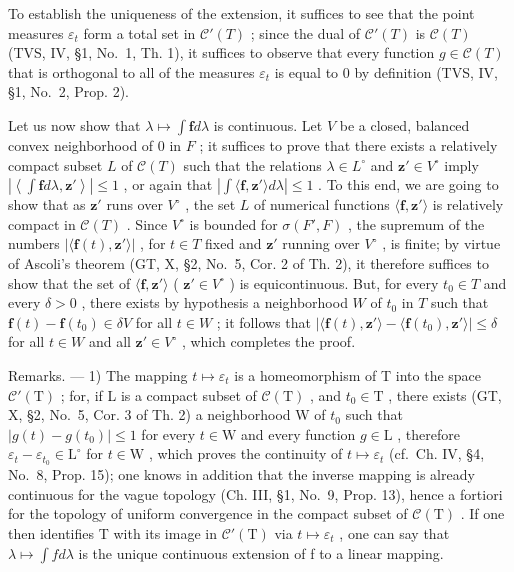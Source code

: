 To establish the uniqueness of the extension, it suffices to see that the point measures \(\varepsilon_{t}\) form a total set in \(\mathcal{C}'(T)\) ; since the dual of \(\mathcal{C}'(T)\) is \(\mathcal{C}(T)\) (TVS, IV, §1, No.~1, Th. 1), it suffices to observe that every function \(g \in \mathcal{C}(T)\) that is orthogonal to all of the measures \(\varepsilon_{t}\) is equal to 0 by definition (TVS, IV, §1, No.~2, Prop. 2).

Let us now show that \(\lambda \mapsto \int \mathbf{f}d\lambda\) is continuous. Let \(V\) be a closed, balanced convex neighborhood of 0 in \(F\) ; it suffices to prove that there exists a relatively compact subset \(L\) of \(\mathcal{C}(T)\) such that the relations \(\lambda \in L^{\circ}\) and \(\mathbf{z}' \in V^{\circ}\) imply \(\left|\left\langle \int \mathbf{f}d\lambda, \mathbf{z}' \right\rangle \right| \leqslant 1\) , or again that \(\left|\int \langle \mathbf{f}, \mathbf{z}' \rangle d\lambda \right| \leqslant 1\) . To this end, we are going to show that as \(\mathbf{z}'\) runs over \(V^{\circ}\) , the set \(L\) of numerical functions \(\langle \mathbf{f}, \mathbf{z}' \rangle\) is relatively compact in \(\mathcal{C}(T)\) . Since \(V^{\circ}\) is bounded for \(\sigma(F', F)\) , the supremum of the numbers \(|\langle \mathbf{f}(t), \mathbf{z}' \rangle|\) , for \(t \in T\) fixed and \(\mathbf{z}'\) running over \(V^{\circ}\) , is finite; by virtue of Ascoli's theorem (GT, X, §2, No.~5, Cor. 2 of Th. 2), it therefore suffices to show that the set of \(\langle \mathbf{f}, \mathbf{z}' \rangle\) ( \(\mathbf{z}' \in V^{\circ}\) ) is equicontinuous. But, for every \(t_0 \in T\) and every \(\delta > 0\) , there exists by hypothesis a neighborhood \(W\) of \(t_0\) in \(T\) such that \(\mathbf{f}(t) - \mathbf{f}(t_0) \in \delta V\) for all \(t \in W\) ; it follows that \(|\langle \mathbf{f}(t), \mathbf{z}' \rangle - \langle \mathbf{f}(t_0), \mathbf{z}' \rangle| \leqslant \delta\) for all \(t \in W\) and all \(\mathbf{z}' \in V^{\circ}\) , which completes the proof.

Remarks. --- 1) The mapping \(t \mapsto \varepsilon_t\) is a homeomorphism of T into the space \(\mathcal{C}'(\mathrm{T})\) ; for, if L is a compact subset of \(\mathcal{C}(\mathrm{T})\) , and \(t_0 \in \mathrm{T}\) , there exists (GT, X, §2, No.~5, Cor. 3 of Th. 2) a neighborhood W of \(t_0\) such that \(|g(t) - g(t_0)| \leqslant 1\) for every \(t \in \mathrm{W}\) and every function \(g \in \mathrm{L}\) , therefore \(\varepsilon_t - \varepsilon_{t_0} \in \mathrm{L}^\circ\) for \(t \in \mathrm{W}\) , which proves the continuity of \(t \mapsto \varepsilon_t\) (cf.~Ch. IV, §4, No.~8, Prop. 15); one knows in addition that the inverse mapping is already continuous for the vague topology (Ch. III, §1, No.~9, Prop. 13), hence a fortiori for the topology of uniform convergence in the compact subset of \(\mathcal{C}(\mathrm{T})\) . If one then identifies T with its image in \(\mathcal{C}'(\mathrm{T})\) via \(t \mapsto \varepsilon_t\) , one can say that \(\lambda \mapsto \int f d\lambda\) is the unique continuous extension of f to a linear mapping.

